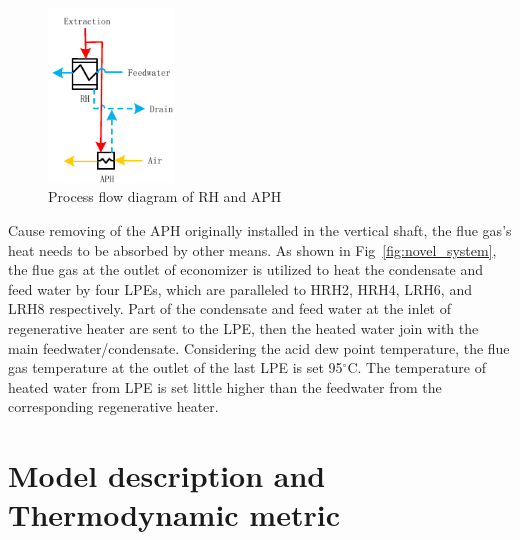 \documentclass[preprint,12pt]{elsarticle}
\begin{document}
\begin{figure}[htbp]
\centering
\includegraphics[width=0.3\textwidth]{fig/extraction_heat_APH}%
\caption{Process flow diagram of RH and APH} 
\label{fig:extraction_heat_APH}
\end{figure}

Cause removing of the APH originally installed in the vertical shaft, the flue gas's heat needs to be absorbed by other means.
As shown in Fig~\ref{fig:novel_system}, the flue gas at the outlet of economizer is utilized to heat the condensate and feed water by four LPEs, which are paralleled to HRH2, HRH4, LRH6, and LRH8 respectively. 
Part of the condensate and feed water at the inlet of regenerative heater are sent to the LPE, then the heated water join with the main feedwater/condensate. 
Considering the acid dew point temperature, the flue gas temperature at the outlet of the last LPE is set 95$^\circ$C. 
The temperature of heated water from LPE is set little higher than the feedwater from the corresponding regenerative heater.%

\section{Model description and Thermodynamic metric}
\label{ssub:model_establishment_and_system_analysis_method}
\end{document}
